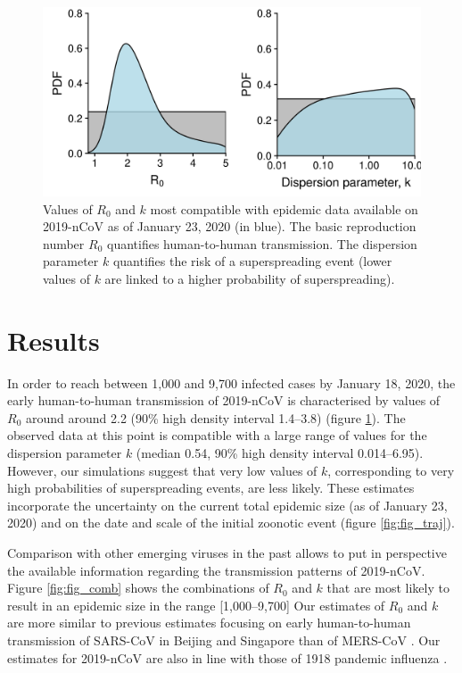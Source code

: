 \documentclass{article}
\begin{document}
\begin{figure}[b]
	\centering
	\includegraphics[width=.6\linewidth]{../figure/fig_post.png}
	\caption{Values of $R_0$ and $k$ most compatible with epidemic data available on 2019-nCoV as of January 23, 2020 (in blue). The basic reproduction number $R_0$ quantifies human-to-human transmission. The dispersion parameter $k$ quantifies the risk of a superspreading event (lower values of $k$ are linked to a higher probability of superspreading).}
	\label{fig:fig_post}
\end{figure}


\section*{Results}
In order to reach between 1,000 and 9,700 infected cases by January 18, 2020, the early human-to-human transmission of 2019-nCoV is characterised by values of $R_0$ around around 2.2 (90\% high density interval 1.4--3.8) (figure \ref{fig:fig_post}).
The observed data at this point is compatible with a large range of values for the dispersion parameter $k$ (median 0.54, 90\% high density interval 0.014--6.95).
However, our simulations suggest that very low values of $k$, corresponding to very high probabilities of superspreading events, are less likely.
These estimates incorporate the uncertainty on the current total epidemic size (as of January 23, 2020) and on the date and scale of the initial zoonotic event (figure \ref{fig:fig_traj}).


Comparison with other emerging viruses in the past allows to put in perspective the available information regarding the transmission patterns of 2019-nCoV.
Figure \ref{fig:fig_comb} shows the combinations of $R_0$ and $k$ that are most likely to result in an epidemic size in the range [1,000--9,700] 
Our estimates of $R_0$ and $k$ are more similar to previous estimates focusing on early human-to-human transmission of SARS-CoV in Beijing and Singapore \cite{Lloyd-Smith:2005} than of MERS-CoV \cite{Kucharski:2015b}.
Our estimates for 2019-nCoV are also in line with those of 1918 pandemic influenza \cite{Fraser:2011}.
\end{document}

